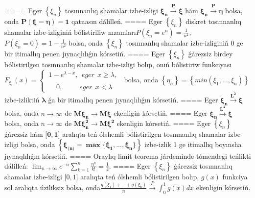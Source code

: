 ====
Eger \(\left\{ \xi_{n} \right\}\) tosınnanlıq shamalar izbe-izligi \(\mathbf{\xi}_{\mathbf{n}}\overset{\mathbf{P}}{\rightarrow}\mathbf{\xi}\) hám \(\mathbf{\xi}_{\mathbf{n}}\overset{\mathbf{P}}{\rightarrow}\mathbf{\eta}\) bolsa, onda \(\mathbf{P}\left( \mathbf{\xi = \eta} \right)\mathbf{=}\mathbf{1}\) qatnasın dálilleń.
====
Eger \(\left\{ \xi_{n} \right\}\) diskret tosınnanlıq shamalar izbe-izliginiń bólistiriliw nızamları\(P(\xi_{n} = e^{n}) = \frac{1}{n^{2}},\) \(P(\xi_{n} = 0) = 1 - \frac{1}{n^{2}}\) bolsa, onda \(\left\{ \xi_{n} \right\}\) tosınnanlıq shamalar izbe-izliginiń 0 ge bir itimallıq penen jıynaqlılıǵın kórsetiń.
====
Eger \(\left\{ \xi_{n} \right\}\) ǵárezsiz birdey bólistirilgen tosınnanlıq shamalar izbe-izligi bolıp, onıń bólistiriw funkciyası \(F_{\xi_{1}}(x) = \left\{ \begin{matrix}
\ 1 - e^{\lambda - x},\ \ eger\ \ x \geq \lambda, \\
 \\
\ \ \ \ \ \ 0,\ \ \ \ \ \ \ \ \ \ \ eger\ \ x < \lambda
\end{matrix} \right.\ \) bolsa, onda \(\left\{ \eta_{n} \right\} = \left\{ min(\xi_{1},...,\xi_{n}) \right\}\) izbe-izliktiń \(\mathbf{\lambda}\) ǵa bir itimallıq penen jıynaqlılıǵın kórsetiń.
====
Eger \(\mathbf{\xi}_{\mathbf{n}}\overset{\mathbf{L}^{\mathbf{2}}}{\rightarrow}\mathbf{\xi}\) bolsa, onda \(n \rightarrow \infty\) de \(\mathbf{M}\mathbf{\xi}_{\mathbf{n}}\mathbf{\rightarrow M\xi}\) ekenligin kórsetiń.
====
Eger \(\mathbf{\xi}_{\mathbf{n}}\overset{\mathbf{L}^{\mathbf{2}}}{\rightarrow}\mathbf{\xi}\) bolsa, onda \(n \rightarrow \infty\) de \(\mathbf{M}\mathbf{\xi}_{\mathbf{n}}^{\mathbf{2}}\mathbf{\rightarrow M}\mathbf{\xi}^{\mathbf{2}}\) ekenligin kórsetiń.
====
Eger \(\left\{ \xi_{n} \right\}\) ǵárezsiz hám \(\mathbf{\lbrack 0,1\rbrack}\) aralıqta teń ólshemli bólistirilgen tosınnanlıq shamalar izbe-izligi bolsa, onda \(\left\{ \mathbf{\xi}_{\mathbf{(}\mathbf{n}\mathbf{)}}\mathbf{=}\mathbf{\max}\mathbf{\{}\mathbf{\xi}_{\mathbf{1}}\mathbf{,...,}\mathbf{\xi}_{\mathbf{n}}\mathbf{\}} \right\}\) izbe-izlik 1 ge itimallıq boyınsha jıynaqlılıǵın kórsetiń.
====
Oraylıq limit teorema járdeminde tómendegi teńlikti dálilleń: \(\lim_{n \rightarrow \infty}e^{- n}\sum_{k = 1}^{n}\frac{n^{k}}{k!} = \frac{1}{2}.\)
====
Eger \(\left\{ \xi_{n} \right\}\) ǵárezsiz tosınnanlıq shamalar izbe-izligi \(\lbrack 0,1\rbrack\) aralıqta teń ólshemli bólistirilgen bolıp, \(g(x)\) funkciya sol aralıqta úziliksiz bolsa, onda\(\frac{g\left( \xi_{1} \right) + ... + g\left( \xi_{n} \right)}{n}\overset{P}{\rightarrow}\int_{0}^{1}{g(x)}dx\) ekenligin kórsetiń.
